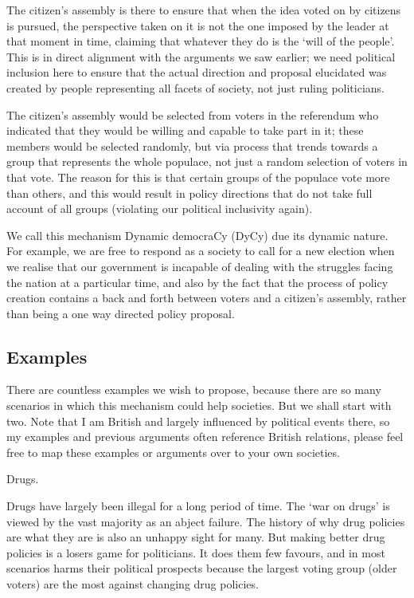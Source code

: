 \documentclass[twoside]{article}
\begin{document}
The citizen’s assembly is there to ensure that when the idea voted on by citizens is pursued, the perspective taken on it is not the one imposed by the leader at that moment in time, claiming that whatever they do is the ‘will of the people’. This is in direct alignment with the arguments we saw earlier; we need political inclusion here to ensure that the actual direction and proposal elucidated was created by people representing all facets of society, not just ruling politicians.

The citizen’s assembly would be selected from voters in the referendum who indicated that they would be willing and capable to take part in it; these members would be selected randomly, but via process that trends towards a group that represents the whole populace, not just a random selection of voters in that vote. The reason for this is that certain groups of the populace vote more than others, and this would result in policy directions that do not take full account of all groups (violating our political inclusivity again).

We call this mechanism Dynamic democraCy (DyCy) due its dynamic nature. For example, we are free to respond as a society to call for a new election when we realise that our government is incapable of dealing with the struggles facing the nation at a particular time, and also by the fact that the process of policy creation contains a back and forth between voters and a citizen’s assembly, rather than being a one way directed policy proposal.

\subsection{Examples}

There are countless examples we wish to propose, because there are so many scenarios in which this mechanism could help societies. But we shall start with two. Note that I am British and largely influenced by political events there, so my examples and previous arguments often reference British relations, please feel free to map these examples or arguments over to your own societies.

Drugs.

Drugs have largely been illegal for a long period of time. The ‘war on drugs’ is viewed by the vast majority as an abject failure. The history of why drug policies are what they are is also an unhappy sight for many. But making better drug policies is a losers game for politicians. It does them few favours, and in most scenarios harms their political prospects because the largest voting group (older voters) are the most against changing drug policies.
\end{document}
